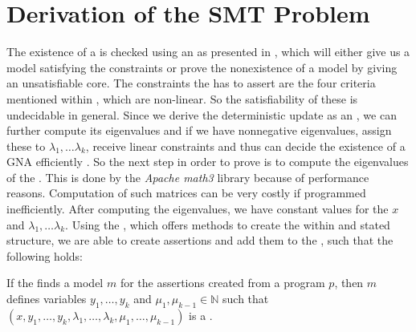 \section{Derivation of the SMT Problem}
\label{sec:derivation-smt}
The existence of a \gna is checked using an \solver as presented in , which will either give us a model satisfying the constraints or prove the nonexistence of a model by giving an unsatisfiable core. \newline
The constraints the \solver has to assert are the four criteria mentioned within , which are non-linear. So the satisfiability of these is undecidable in general. Since we derive the deterministic update as an \updatematrix, we can further compute its eigenvalues and if we have nonnegative eigenvalues, assign these to $\lambda_1, \dots \lambda_k$, receive linear constraints and thus can decide the existence of a GNA efficiently \cite{leike2014geometric}.%
\newline
So the next step in order to prove \nonterm is to compute the eigenvalues of the \updatematrix. This is done by the \textit{Apache math3} library \cite{ApacheMath3} because of performance reasons. Computation of such matrices can be very costly if programmed inefficiently. %
After computing the eigenvalues, we have constant values for the \stem $x$ and $\lambda_1, \dots \lambda_k$.
\newline
Using the \smtfactory, which offers methods to create the within  and  stated structure, we are able to create assertions and add them to the \solver, such that the following holds:
\begin{lemma}
	If the \solver finds a model $m$ for the assertions created from a program $p$,
	then $m$ defines variables $y_1, \dots, y_k$ and $\mu_1, \mu_{k-1} \in \mathbb{N}$ such that 
	$(x, y_1, \dots, y_k, \lambda_1, \dots, \lambda_k, \mu_1, \dots, \mu_{k-1})$ is a \gna.
\end{lemma}

